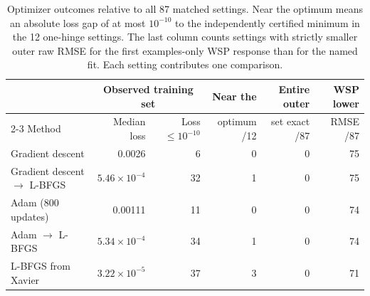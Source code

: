 \begin{table}[htbp]\centering\small
\caption{Optimizer outcomes relative to all 87 matched settings. Near the optimum means an absolute loss gap of at most $10^{-10}$ to the independently certified minimum in the 12 one-hinge settings. The last column counts settings with strictly smaller outer raw RMSE for the first examples-only WSP response than for the named fit. Each setting contributes one comparison.}
\label{tab:limitedmemory_overview}
\setlength{\tabcolsep}{3.2pt}
\begin{tabular}{@{}lrrrrr@{}}
\toprule
 & \multicolumn{2}{c}{Observed training set} & Near the & Entire outer & WSP lower\\
\cmidrule(lr){2-3}
Method & Median loss & Loss $\leq 10^{-10}$ & optimum /12 & set exact /87 & RMSE /87\\
\midrule
Gradient descent & 0.0026 & 6 & 0 & 0 & 75 \\
Gradient descent $\to$ L-BFGS & $5.46\!\times\!10^{-4}$ & 32 & 1 & 0 & 75 \\
Adam (800 updates) & 0.00111 & 11 & 0 & 0 & 74 \\
Adam $\to$ L-BFGS & $5.34\!\times\!10^{-4}$ & 34 & 1 & 0 & 74 \\
L-BFGS from Xavier & $3.22\!\times\!10^{-5}$ & 37 & 3 & 0 & 71 \\
\bottomrule
\end{tabular}
\end{table}

